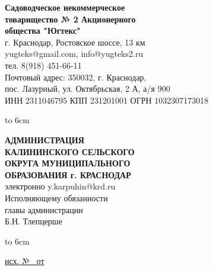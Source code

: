 \noindent\parbox[l][71mm]{80mm}
{
	 \begin{center}
 {\small \textbf{Садоводческое некоммерческое\\ товарищество
 	№  2 Акционерного\\ общества "Югтекс"\\
 }}
 \footnotesize{г. Краснодар, Ростовское шоссе, 13 км\\
 	yugteks@gmail.com, info@yugteks2.ru\\
 	тел. 8(918) 451-66-11\\
 	Почтовый адрес: 350032, г. Краснодар,\\ пос. Лазурный, ул. Октябрьская, 2 А, а/я   900
  }\\
 {ИНН 2311046795 КПП 231201001 ОГРН 1032307173018}
		\end{center}
\hbox to 6cm{ }}\hfill
\parbox[l][71mm]{65mm}
{ \begin{center}
  {\small \textbf{АДМИНИСТРАЦИЯ\\ КАЛИНИНСКОГО
 		СЕЛЬСКОГО\\ ОКРУГА МУНИЦИПАЛЬНОГО\\
 		ОБРАЗОВАНИЯ г. КРАСНОДАР\\
 }}
 \vspace{2mm}
 \footnotesize{электронно y.karpuhin@krd.ru\\
 \vspace{2mm}
 {\normalsize  	 Исполняющему обязанности\\
 	главы администрации\\}
 	 \vspace{6mm}
 	 {\normalsize 	Б.Н. Тлепцерше}
 }\\
 \end{center}
\hbox to 6cm{ }}
\linebreak
\vspace{-10mm}

\underline{исх. №  \ от } 